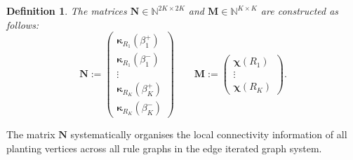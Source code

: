 \documentclass[12pt]{iopart}
\newtheorem{definition}[theorem]{Definition}
\newcommand*{\bbbchi}{\boldsymbol{\chi}}
\newcommand*{\bkappa}{\boldsymbol{\kappa}}
\begin{document}
\begin{definition}
The matrices $\mathbf{N}\in\mathbb{N}^{2K \times 2K}$ and $\mathbf{M}\in\mathbb{N}^{K \times K}$ are constructed as follows:
\[
      \mathbf{N} := 
      \begin{pmatrix}
    \bkappa_{R_1}(\beta_1^+) \\
    \bkappa_{R_1}(\beta_1^-) \\[-1mm]
    \vdots \\
    \bkappa_{R_K}(\beta_K^+) \\
    \bkappa_{R_K}(\beta_K^-)    
    \end{pmatrix} \qquad
    \mathbf{M} := 
    \begin{pmatrix}
    \bbbchi(R_1) \\[-1mm]
    \vdots \\
    \bbbchi(R_K)   
    \end{pmatrix}  .
\]
\end{definition}
The matrix $\mathbf{N}$ systematically organises the local connectivity information of all planting vertices across all rule graphs in the edge iterated graph system. 

\end{document}
